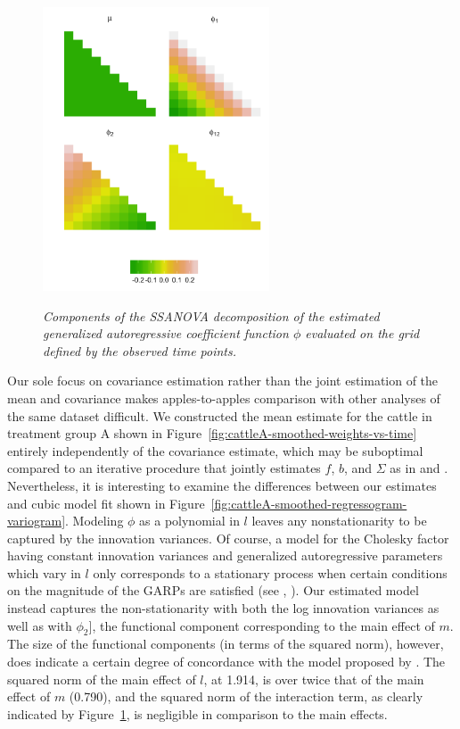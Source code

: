 %
\begin{figure}[H] 
\centering
\caption{\textit{Components of the SSANOVA decomposition of the estimated generalized autoregressive coefficient function $\phi$ evaluated on the grid defined by the observed time points.}}
  \includegraphics[width = 0.6\textwidth]{img/chapter-5/cattle-ssanova-estimate-lattice} \label{fig:cattle-fitted-cholesky-ssanova}
\end{figure}


Our sole focus on covariance estimation rather than the joint estimation of the mean and covariance makes apples-to-apples comparison with other analyses of the same dataset difficult. We constructed the mean estimate for the cattle in treatment group A shown in Figure~\ref{fig:cattleA-smoothed-weights-vs-time} entirely independently of the covariance estimate, which may be suboptimal compared to an iterative procedure that jointly estimates $f$, $b$, and $\Sigma$ as in \cite{pan2017jmcm} and \cite{pourahmadi1999joint}. Nevertheless, it is interesting to examine the differences between our estimates and cubic model fit shown in Figure~\ref{fig:cattleA-smoothed-regressogram-variogram}. Modeling $\phi$ as a polynomial in $l$ leaves any nonstationarity to be captured by the innovation variances. Of course, a model for the Cholesky factor having constant innovation variances and generalized autoregressive parameters which vary in $l$ only corresponds to a stationary process when certain conditions on the magnitude of the GARPs are satisfied (see \citep{klein1997statistical}, \citep{madsen2007time}). Our estimated model instead captures the non-stationarity with both the log innovation variances as well as with $\phi_2]$, the functional component corresponding to the main effect of $m$. The size of the functional components (in terms of the squared norm), however, does indicate a certain degree of concordance with the model proposed by \cite{pourahmadi1999joint}. The squared norm of the main effect of $l$, at 1.914, is over twice that of the main effect of $m$ (0.790), and the squared norm of the interaction term, as clearly indicated by Figure~\ref{fig:cattle-fitted-cholesky-ssanova}, is negligible in comparison to the main effects.



%
%
%
